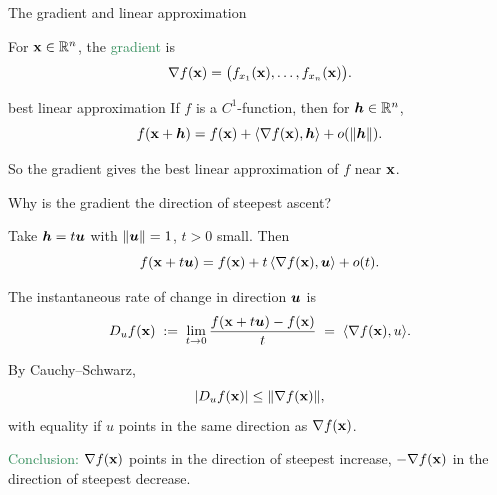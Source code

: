 \documentclass[11pt,aspectratio=169]{beamer}
\begin{document}
\begin{frame}[label=LinAp]{The gradient and linear approximation}

For ${\bf x}\in\mathbb R^n$, the \textcolor{SeaGreen}{gradient} is
\[
\nabla f({\bf x})=\big(f_{x_1}({\bf x}),\dots,f_{x_n}({\bf x})\big).
\]

\vskip 6pt
\begin{alertblock}{best linear approximation}	
If $f$ is a $C^1$-function, then for $\boldsymbol h\in \mathbb R^n$,
\[
f({\bf x}+\boldsymbol h)=f({\bf x})+\langle \nabla f({\bf x}),\boldsymbol h\rangle + o(\|\boldsymbol h\|).
\]

So the gradient gives the \alert{best linear approximation} of $f$ near ${\bf x}$.
\end{alertblock}
\end{frame}

\begin{frame}{Why is the gradient the direction of steepest ascent?}

Take $\boldsymbol h=t\boldsymbol u$ with $\|\boldsymbol u\|=1$, $t>0$ small. Then
\[
f({\bf x}+t\boldsymbol u) = f({\bf x}) + t\,\langle \nabla f({\bf x}),\boldsymbol u\rangle+o(t).
\]

\vskip 6pt
The instantaneous rate of change in direction $\boldsymbol u$ is
\[
D_u f({\bf x})\;:=\;\lim_{t\to 0}\frac{f({\bf x}+t\boldsymbol u)-f({\bf x})}{t} \;=\; \langle \nabla f({\bf x}),u\rangle.
\]

\vskip 6pt
By Cauchy–Schwarz,
\[
|D_u f({\bf x})| \le \|\nabla f({\bf x})\|,
\]
with equality if $u$ points in the same direction as $\nabla f({\bf x})$.

\vskip 6pt
\textcolor{SeaGreen}{Conclusion:}  
$\nabla f({\bf x})$ points in the direction of \alert{steepest increase},  
$-\nabla f({\bf x})$ in the direction of \alert{steepest decrease}.
\end{frame}
\end{document}
